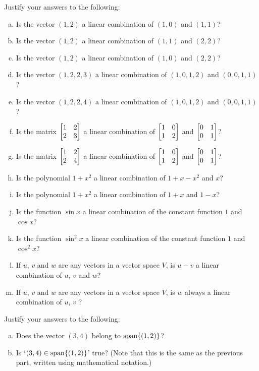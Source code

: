 
  

 \begin{prob} \label{prob06.1} Justify your answers to the following:
\medskip
\begin{enumerate}[a)]
\item Is the vector $(1,2)$ a linear combination of $(1,0)$ and $(1,1)$?
\medskip
%
\item\sov Is the vector $(1,2)$ a linear combination of $(1,1)$ and $(2,2)$?
\medskip
%
\item Is the vector $(1,2)$ a linear combination of $(1,0)$ and $(2,2)$?
\medskip
%
\item\sov Is the vector $(1,2,2,3)$ a linear combination of $(1,0,1,2)$ and $(0,0,1,1)$?
\medskip
%
\item Is the vector $(1,2,2,4)$ a linear combination of $(1,0,1,2)$ and $(0,0,1,1)$?
\medskip
%
\item\sov Is the matrix $\bmatrix 1&2\\2&3\endbmatrix $ a linear combination of $\bmatrix 1&0\\1&2\endbmatrix$ and $ \bmatrix 0&1\\0&1\endbmatrix $?
\medskip
%
\item Is the matrix $\bmatrix 1&2\\2&4\endbmatrix $ a linear combination of $\bmatrix 1&0\\1&2\endbmatrix$ and $ \bmatrix 0&1\\0&1\endbmatrix $?
\medskip
%
\item\sov Is the polynomial $1+x^2$ a linear combination of $1+x-x^2$ and $x$?
\medskip
%
\item Is the polynomial $1+x^2$ a linear combination of $1+x$ and $1-x$?
\medskip
%
\item\sov Is the function $\sin x$ a linear combination of the constant function $1$ and $\cos x$?
\medskip
%
\item Is the function $\sin^2 x$ a linear combination of the constant function $1$ and $\cos^2 x$?
\medskip
%
\item\sov If $u$, $v$ and $w$ are any vectors in  a vector space $V$, is $u-v$ a linear combination of $u$, $v$ and $w$?
\medskip
%
\item If $u$, $v$ and $w$ are any vectors in  a vector space $V$, is $w$ always a linear combination of $u$, $v$ ?
\medskip 
%
 
\end{enumerate}

\end{prob} \begin{prob} \label{prob06.2}  Justify your answers to the following:
\medskip
\begin{enumerate}[a)]
\item Does the vector $(3,4)$ belong to $\textrm{span}\{(1,2)\}$?\medskip
%
\item\sov Is  `$(3,4) \in\textrm{span}\{(1,2)\} $' true? (Note that this is the same as the previous part, written using mathematical notation.)
\medskip


\end{enumerate}
\end{prob}
